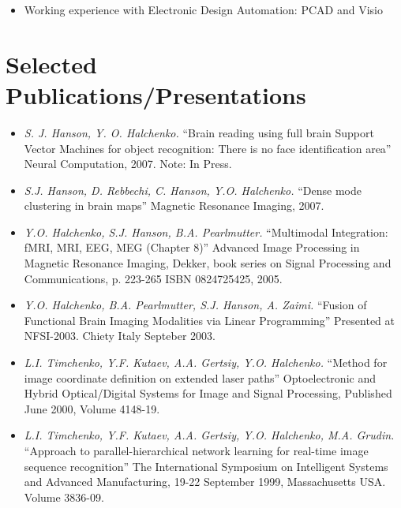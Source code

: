 \documentclass[10pt,overlapped,line]{res}
\newcommand{\mtitle}[1]{``#1''}
\newcommand{\mauthors}[1]{ \textit{#1.}}
\newcommand{\mwhere}[1]{#1.}
\begin{document}
\begin{resume}
\begin{description}
\begin{itemize}
      \item Working experience with Electronic Design Automation: PCAD and
        Visio
      \end{itemize}
  \end{description}

 \section{Selected Publications/Presentations}

 \begin{itemize}

  \item
    \mauthors{S. J. Hanson, Y. O. Halchenko}
    \mtitle{Brain reading using full brain Support Vector Machines for
      object recognition: There is no face identification area}
    \mwhere{Neural Computation, 2007. Note: In Press}

  \item
    \mauthors{S.J. Hanson, D. Rebbechi, C. Hanson, Y.O. Halchenko}
    \mtitle{Dense mode clustering in brain maps}
    \mwhere{Magnetic Resonance Imaging, 2007}

  \item
    \mauthors{Y.O. Halchenko, S.J. Hanson, B.A. Pearlmutter}
    \mtitle{Multimodal Integration: fMRI, MRI, EEG, MEG (Chapter 8)}
    \mwhere{Advanced Image Processing in Magnetic Resonance Imaging,
      Dekker, book series on Signal Processing and Communications, p. 223-265
      ISBN 0824725425, 2005}

  \item
     \mauthors{Y.O. Halchenko, B.A. Pearlmutter, S.J. Hanson, A. Zaimi}
     \mtitle{Fusion of Functional Brain Imaging Modalities via Linear Programming}
     \mwhere{Presented at NFSI-2003. Chiety Italy Septeber 2003}

  \item
     \mauthors{L.I. Timchenko, Y.F. Kutaev, A.A. Gertsiy, Y.O. Halchenko}
     \mtitle{Method for image coordinate definition on extended laser paths}
     \mwhere{Optoelectronic and Hybrid Optical/Digital Systems for Image and Signal Processing, Published June 2000,  Volume 4148-19}

  \item
     \mauthors{L.I. Timchenko, Y.F. Kutaev, A.A. Gertsiy, Y.O. Halchenko,
     M.A. Grudin}
     \mtitle{Approach to parallel-hierarchical network learning for real-time image sequence recognition}
     \mwhere{The International Symposium on Intelligent Systems and Advanced Manufacturing, 19-22 September 1999, Massachusetts USA. Volume 3836-09}


\end{itemize}
\end{resume}
\end{document}

